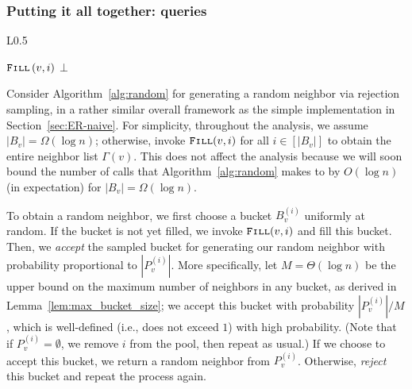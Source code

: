 \subsubsection{Putting it all together:  queries}
\label{sec:random_neighbor}

\begin{wrapfigure}[18]{L}{0.5\textwidth}
    \caption{Bucketing Generator}
    \label{alg:random}
    \begin{algorithmic}
                    \State$\texttt{\textsc{Fill}}\left( v,i\right)$
                \EndIf
                \Else
                \EndIf
            \EndWhile
            \State \Return $\bot$
        \EndProcedure
    \end{algorithmic}
\end{wrapfigure}

Consider Algorithm~\ref{alg:random} for generating a random neighbor via rejection sampling, in a rather similar overall framework as the simple implementation in Section~\ref{sec:ER-naive}.
For simplicity, throughout the analysis, we assume $|B_v| = \Omega(\log n)$; otherwise, invoke $\texttt{\textsc{Fill}}(v,i)$ for all $i \in [|B_v|]$ to obtain the entire neighbor list $\Gamma(v)$. This does not affect the analysis because we will soon bound the number of calls that Algorithm~\ref{alg:random} makes to  by $O(\log n)$ (in expectation) for $|B_v| = \Omega(\log n)$.

To obtain a random neighbor, we first choose a bucket $B_v^{(i)}$ uniformly at random.
If the bucket is not yet filled, we invoke $\texttt{\textsc{Fill}}(v,i)$ and fill this bucket.
Then, we \emph{accept} the sampled bucket for generating our random neighbor with probability proportional to $|P_v^{(i)}|$. More specifically, let $M = \Theta(\log n)$ be the upper bound on the maximum number of neighbors in any bucket, as derived in Lemma~\ref{lem:max_bucket_size}; we accept this bucket with probability $|P_v^{(i)}|/M$, which is well-defined (i.e., does not exceed $1$) with high probability. 
(Note that if $P_v^{(i)} = \emptyset$, we remove $i$ from the pool, then repeat as usual.) 
If we choose to accept this bucket, we return a random neighbor from $P_v^{(i)}$.
Otherwise, \emph{reject} this bucket and repeat the process again.

